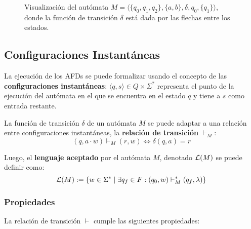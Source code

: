 \begin{figure}[H]
    \centering
    \caption*{Visualización del autómata $M = \langle \{q_0, q_1, q_2\}, \{a, b\}, \delta, q_0, \{q_1\} \rangle$, donde la función de transición $\delta$ está dada por las flechas entre los estados.}
\end{figure}

\subsection{Configuraciones Instantáneas}

La ejecución de los AFDs se puede formalizar usando el concepto de las \textbf{configuraciones instantáneas}: $\langle q, s \rangle \in Q \times \Sigma^*$ representa el punto de la ejecución del autómata en el que se encuentra en el estado $q$ y tiene a $s$ como entrada restante.

La función de transición $\delta$ de un autómata $M$ se puede adaptar a una relación entre configuraciones instantáneas, la \textbf{relación de transición} $\vdash_M$:
$$
    (q, a \cdot w) \vdash_M (r, w) \iff \delta(q, a) = r
$$

Luego, el \textbf{lenguaje aceptado} por el autómata $M$, denotado $\mathcal{L}(M)$ se puede definir como:
$$
    \mathcal{L}(M) := \{ w \in \Sigma^* \mid \exists q_f \in F : (q_0, w) \vdash_M^* (q_f, \lambda) \}
$$

\subsubsection{Propiedades}
\label{subsubsec-propiedades-rel-transicion}

La relación de transición $\vdash$ cumple las siguientes propiedades:

